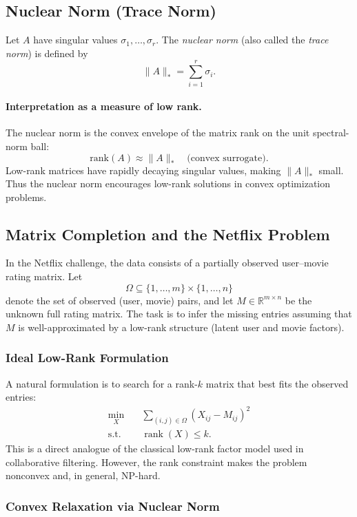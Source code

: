 \documentclass{article}
\begin{document}
\subsection{Nuclear Norm (Trace Norm)}

Let $A$ have singular values $\sigma_1,\ldots,\sigma_r$.  
The \emph{nuclear norm} (also called the \emph{trace norm}) is defined by
\[
\|A\|_* = \sum_{i=1}^r \sigma_i.
\]

\paragraph{Interpretation as a measure of low rank.}
The nuclear norm is the convex envelope of the matrix rank on the unit spectral-norm ball:
\[
\text{rank}(A) \approx \|A\|_* \quad \text{(convex surrogate)}.
\]
Low-rank matrices have rapidly decaying singular values, making $\|A\|_*$ small.  
Thus the nuclear norm encourages low-rank solutions in convex optimization problems.

\subsection{Matrix Completion and the Netflix Problem}

In the Netflix challenge, the data consists of a partially observed user--movie rating matrix.  
Let
\[
\Omega \subseteq \{1,\ldots,m\}\times\{1,\ldots,n\}
\]
denote the set of observed (user, movie) pairs, and let $M\in\mathbb{R}^{m\times n}$ be the unknown full rating matrix.  
The task is to infer the missing entries assuming that $M$ is well-approximated by a low-rank structure (latent user and movie factors).

\subsubsection{Ideal Low-Rank Formulation}

A natural formulation is to search for a rank-$k$ matrix that best fits the observed entries:
\[
\begin{aligned}
\min_{X} \quad &
\sum_{(i,j)\in\Omega} (X_{ij} - M_{ij})^2 \\
\text{s.t.}\quad &
\operatorname{rank}(X) \le k.
\end{aligned}
\]
This is a direct analogue of the classical low-rank factor model used in collaborative filtering.  
However, the rank constraint makes the problem nonconvex and, in general, NP-hard.

\subsubsection{Convex Relaxation via Nuclear Norm}
\end{document}

